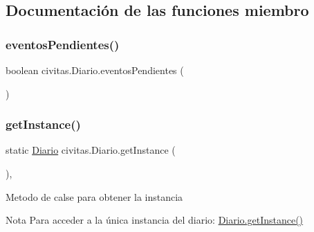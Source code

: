 \subsection{Documentación de las funciones miembro}
\mbox{\label{classcivitas_1_1Diario_a4947b72bc28e0ec2ad1746cb4c46b31c}} 
\subsubsection{\texorpdfstring{eventos\+Pendientes()}{eventosPendientes()}}
{\footnotesize\ttfamily boolean civitas.\+Diario.\+eventos\+Pendientes (\begin{DoxyParamCaption}{ }\end{DoxyParamCaption})\hspace{0.3cm}{\ttfamily [inline]}}

\mbox{\label{classcivitas_1_1Diario_af8e36f90afe1bbaf252205f467b33750}} 
\subsubsection{\texorpdfstring{get\+Instance()}{getInstance()}}
{\footnotesize\ttfamily static \hyperlink{classcivitas_1_1Diario}{Diario} civitas.\+Diario.\+get\+Instance (\begin{DoxyParamCaption}{ }\end{DoxyParamCaption})\hspace{0.3cm}{\ttfamily [inline]}, {\ttfamily [static]}}

Metodo de calse para obtener la instancia \begin{DoxyNote}{Nota}
Para acceder a la única instancia del diario\+: \hyperlink{classcivitas_1_1Diario_af8e36f90afe1bbaf252205f467b33750}{Diario.\+get\+Instance()} 
\end{DoxyNote}
\mbox{\label{classcivitas_1_1Diario_af109f3660de1846cafd7770d01f35457}} 
